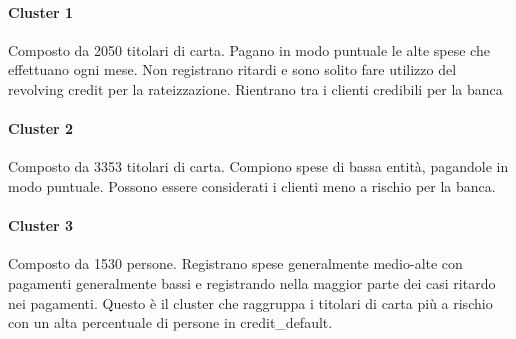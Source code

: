 \paragraph{Cluster 1}
Composto da 2050 titolari di carta. Pagano in modo puntuale le alte spese che effettuano ogni mese. Non registrano ritardi e sono solito fare utilizzo del revolving credit per la rateizzazione. Rientrano tra i clienti credibili per la banca

\paragraph{Cluster 2}
Composto da 3353 titolari di carta. Compiono spese di bassa entità, pagandole in modo puntuale. Possono essere considerati i clienti meno a rischio per la banca.


\paragraph{Cluster 3}
Composto da 1530 persone. Registrano spese generalmente medio-alte con pagamenti generalmente bassi e registrando nella maggior parte dei casi ritardo nei pagamenti. Questo è il cluster che raggruppa i titolari di carta più a rischio con un alta percentuale di persone in credit\_default.


